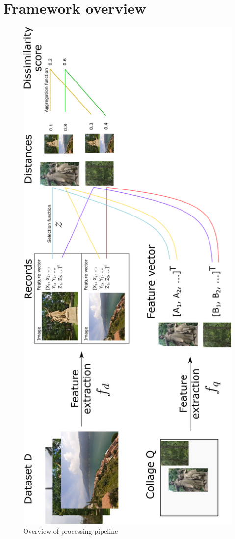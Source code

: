 \section{Framework overview}

\begin{figure}[p!]
    \centering
    \includegraphics[scale=0.9]{img/features_pipeline.png}
    \caption{Overview of processing pipeline}
    \label{fig:processing_pipeline}
\end{figure}

